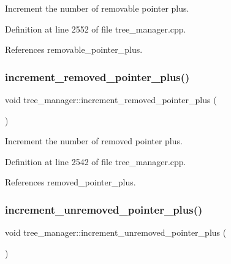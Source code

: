 Increment the number of removable pointer plus. 



Definition at line 2552 of file tree\+\_\+manager.\+cpp.



References removable\+\_\+pointer\+\_\+plus.

\mbox{\label{classtree__manager_a8921dd1183c3686833783e59f0a6e956}} 
\subsubsection{\texorpdfstring{increment\+\_\+removed\+\_\+pointer\+\_\+plus()}{increment\_removed\_pointer\_plus()}}
{\footnotesize\ttfamily void tree\+\_\+manager\+::increment\+\_\+removed\+\_\+pointer\+\_\+plus (\begin{DoxyParamCaption}{ }\end{DoxyParamCaption})}



Increment the number of removed pointer plus. 



Definition at line 2542 of file tree\+\_\+manager.\+cpp.



References removed\+\_\+pointer\+\_\+plus.

\mbox{\label{classtree__manager_adca72df6457b16922fd0c82fea5ff221}} 
\subsubsection{\texorpdfstring{increment\+\_\+unremoved\+\_\+pointer\+\_\+plus()}{increment\_unremoved\_pointer\_plus()}}
{\footnotesize\ttfamily void tree\+\_\+manager\+::increment\+\_\+unremoved\+\_\+pointer\+\_\+plus (\begin{DoxyParamCaption}{ }\end{DoxyParamCaption})}



